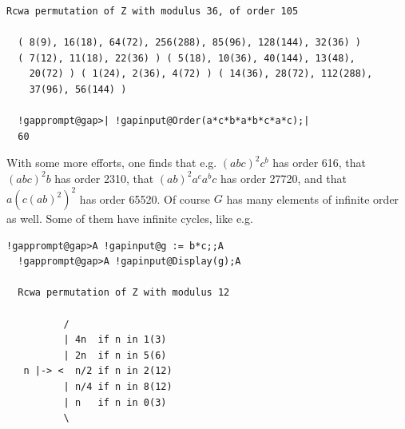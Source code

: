 \documentclass[a4paper,11pt]{report}
\begin{document}
{{\begin{Verbatim}[commandchars=!@|,fontsize=\small,frame=single,label=Example]
  Rcwa permutation of Z with modulus 36, of order 105
  
  ( 8(9), 16(18), 64(72), 256(288), 85(96), 128(144), 32(36) )
  ( 7(12), 11(18), 22(36) ) ( 5(18), 10(36), 40(144), 13(48), 
    20(72) ) ( 1(24), 2(36), 4(72) ) ( 14(36), 28(72), 112(288), 
    37(96), 56(144) )
  
  !gapprompt@gap>| !gapinput@Order(a*c*b*a*b*c*a*c);|
  60
\end{Verbatim}
 With some more efforts, one finds that e.g. $(abc)^2c^b$ has order 616, that $(abc)^2b$ has order 2310, that $(ab)^2a^ca^bc$ has order 27720, and that $a(c(ab)^2)^2$ has order 65520. Of course $G$ has many elements of infinite order as well. Some of them have infinite
cycles, like e.g. 
\begin{Verbatim}[commandchars=!@A,fontsize=\small,frame=single,label=Example]
  !gapprompt@gap>A !gapinput@g := b*c;;A
  !gapprompt@gap>A !gapinput@Display(g);A
  
  Rcwa permutation of Z with modulus 12
  
          /
          | 4n  if n in 1(3)
          | 2n  if n in 5(6)
   n |-> <  n/2 if n in 2(12)
          | n/4 if n in 8(12)
          | n   if n in 0(3)
          \
  

\end{Verbatim}}}
\end{document}
